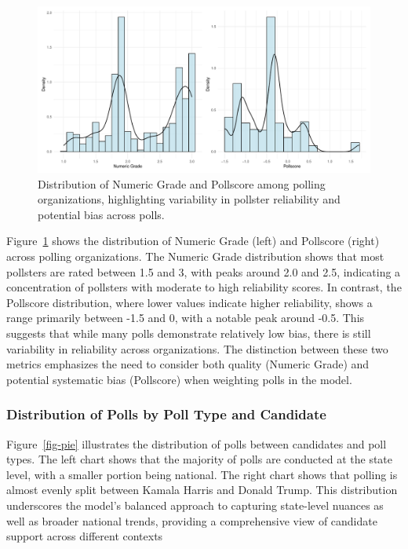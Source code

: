 \documentclass[
  letterpaper,
  DIV=11,
  numbers=noendperiod]{scrartcl}
\begin{document}
\begin{figure}

{\centering \includegraphics{paper_files/figure-pdf/fig-reli-1.pdf}

}

\caption{\label{fig-reli}Distribution of Numeric Grade and Pollscore
among polling organizations, highlighting variability in pollster
reliability and potential bias across polls.}

\end{figure}

Figure~\ref{fig-reli} shows the distribution of Numeric Grade (left) and
Pollscore (right) across polling organizations. The Numeric Grade
distribution shows that most pollsters are rated between 1.5 and 3, with
peaks around 2.0 and 2.5, indicating a concentration of pollsters with
moderate to high reliability scores. In contrast, the Pollscore
distribution, where lower values indicate higher reliability, shows a
range primarily between -1.5 and 0, with a notable peak around -0.5.
This suggests that while many polls demonstrate relatively low bias,
there is still variability in reliability across organizations. The
distinction between these two metrics emphasizes the need to consider
both quality (Numeric Grade) and potential systematic bias (Pollscore)
when weighting polls in the model.

\vspace{0.7cm}

\hypertarget{distribution-of-polls-by-poll-type-and-candidate}{%
\subsubsection{Distribution of Polls by Poll Type and
Candidate}\label{distribution-of-polls-by-poll-type-and-candidate}}

Figure~\ref{fig-pie} illustrates the distribution of polls between
candidates and poll types. The left chart shows that the majority of
polls are conducted at the state level, with a smaller portion being
national. The right chart shows that polling is almost evenly split
between Kamala Harris and Donald Trump. This distribution underscores
the model's balanced approach to capturing state-level nuances as well
as broader national trends, providing a comprehensive view of candidate
support across different contexts
\end{document}
